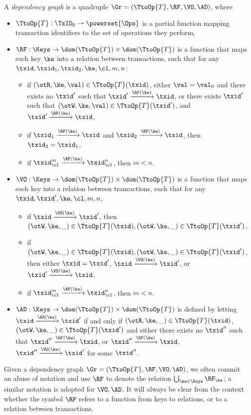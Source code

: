\begin{definition}
A \emph{dependency graph} is a quadruple $\Gr = (\TtoOp{T}, \RF, \VO, \AD)$, where
\begin{itemize}
\item $\TtoOp{T}: \TxID_{0} \rightharpoonup \powerset{\Ops}$ is a partial function 
mapping transaction identifiers to the set of operations they perform, 
\item $\RF : \Keys \rightarrow \dom(\TtoOp{T}) \times \dom(\TtoOp{T})$ is a function that 
maps each key $\ke$ into a relation between transactions, such that for any $\txid, \txid_1, \txid_2, 
\ke, \cl, m, n$: 
\begin{itemize}
\item if $(\otR, \ke, \val) \in \TtoOp{T}(\txid)$, either $\val = \val_0$ 
and there exists no $\txid'$ such that $\txid' \xrightarrow{\RF(\ke)} \txid$,  
or there exists $\txid'$ such that $(\otW, \ke, \val) \in \TtoOp{T}(\txid')$, and $\txid' \xrightarrow{\RF(\ke)} \txid$, 
\item if $\txid_1 \xrightarrow{\RF(\ke)} \txid$ and $\txid_2 \xrightarrow{\RF(\ke)} \txid$, then 
$\txid_2 = \txid_1$, 
\item if $\txid_{\cl}^{m} \xrightarrow{\RF(\ke)} \txid_{\cl}^{n}$, then $m < n$.
\end{itemize}
\item $\VO: \Keys \rightarrow \dom(\TtoOp{T}) \times \dom(\TtoOp{T})$ is a function 
that maps each key into a relation between transactions, such that for any $\txid, \txid', \ke, \cl, m, n$, 
\begin{itemize}
\item if $\txid \xrightarrow{\VO(\ke)} \txid'$, then $(\otW, \ke, \_) \in \TtoOp{T}(\txid), (\otW, \ke, \_) \in \TtoOp{T}(\txid')$, 
\item if $(\otW, \ke, \_) \in \TtoOp{T}(\txid), (\otW, \ke, \_) \in \TtoOp{T}(\txid')$, then either $\txid = \txid'$, 
$\txid \xrightarrow{\VO(\ke)} \txid'$, or $\txid' \xrightarrow{\VO(\ke)} \txid$, 
\item if $\txid_{\cl}^{m} \xrightarrow{\RF(\ke)} \txid_{\cl}^{n}$, then $m < n$.
\end{itemize}
\item $\AD: \Keys \rightarrow \dom(\TtoOp{T}) \times \dom(\TtoOp{T})$ is defined 
by letting $\txid \xrightarrow{\AD(\ke)} \txid'$ if and only if $(\otR, \ke, \_) \in \TtoOp{T}(\txid)$, 
$(\otW, \ke, \_) \in \TtoOp{T}(\txid')$ and 
either there exists no $\txid''$ such that $\txid'' \xrightarrow{\RF(\ke)} \txid$, or 
$\txid'' \xrightarrow{\RF(\ke)} \txid$, $\txid'' \xrightarrow{\VO(\ke)} \txid'$ for 
some $\txid''$.
\end{itemize}
\end{definition}
Given a dependency graph $\Gr = (\TtoOp{T}, \RF, \VO, \AD)$, we often 
commit an abuse of notation and use $\RF$ to denote the relation 
$\bigcup_{\ke \in \Keys} \RF_{\ke}$; a similar notation is adopted for $\VO, \AD$. 
It will always be clear from the context whether the symbol $\RF$ refers to a function 
from keys to relations, or to a relation between transactions. 


